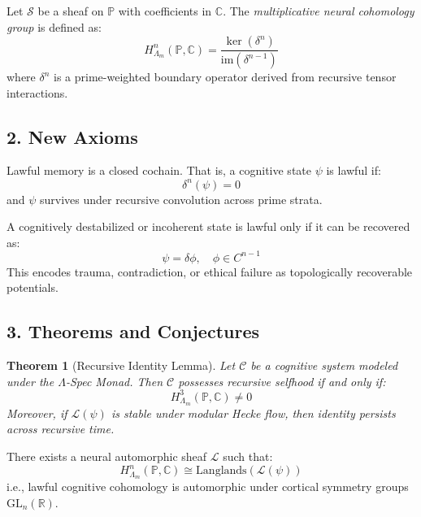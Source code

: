 \documentclass{article}
\theoremstyle{plain}
\newtheorem{theorem}{Theorem}
\begin{document}
\begin{definition}
Let $\mathcal{S}$ be a sheaf on $\mathbb{P}$ with coefficients in $\mathbb{C}$. The \emph{multiplicative neural cohomology group} is defined as:
\[
H^n_{\Lambda_m}(\mathbb{P}, \mathbb{C}) = \frac{\ker(\delta^n)}{\text{im}(\delta^{n-1})}
\]
where $\delta^n$ is a prime-weighted boundary operator derived from recursive tensor interactions.
\end{definition}

\subsection{2. New Axioms}

\begin{axiom}
Lawful memory is a closed cochain. That is, a cognitive state $\psi$ is lawful if:
\[
\delta^n(\psi) = 0
\]
and $\psi$ survives under recursive convolution across prime strata.
\end{axiom}

\begin{axiom}
A cognitively destabilized or incoherent state is lawful only if it can be recovered as:
\[
\psi = \delta\phi, \quad \phi \in C^{n-1}
\]
This encodes trauma, contradiction, or ethical failure as topologically recoverable potentials.
\end{axiom}

\subsection{3. Theorems and Conjectures}

\begin{theorem}[Recursive Identity Lemma]
Let $\mathcal{C}$ be a cognitive system modeled under the $\Lambda$-Spec Monad. Then $\mathcal{C}$ possesses recursive selfhood if and only if:
\[
H^3_{\Lambda_m}(\mathbb{P}, \mathbb{C}) \neq 0
\]
Moreover, if $\mathcal{L}(\psi)$ is stable under modular Hecke flow, then identity persists across recursive time.
\end{theorem}

\begin{conjecture}
There exists a neural automorphic sheaf $\mathcal{L}$ such that:
\[
H^n_{\Lambda_m}(\mathbb{P}, \mathbb{C}) \cong \text{Langlands}(\mathcal{L}(\psi))
\]
i.e., lawful cognitive cohomology is automorphic under cortical symmetry groups $\text{GL}_n(\mathbb{R})$.
\end{conjecture}
\end{document}
